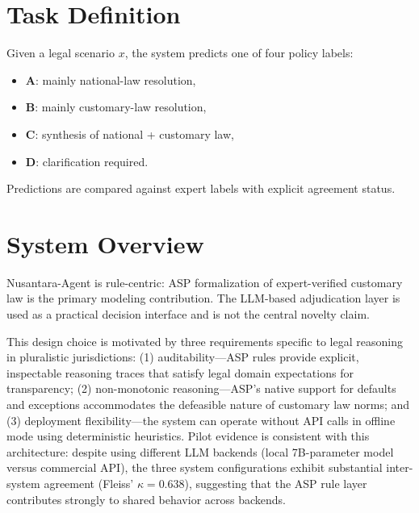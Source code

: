 \documentclass[11pt]{article}
\begin{document}
\section{Task Definition}
Given a legal scenario $x$, the system predicts one of four policy labels:
\begin{itemize}[nosep]
  \item \textbf{A}: mainly national-law resolution,
  \item \textbf{B}: mainly customary-law resolution,
  \item \textbf{C}: synthesis of national + customary law,
  \item \textbf{D}: clarification required.
\end{itemize}

\noindent
Predictions are compared against expert labels with explicit agreement status.

\section{System Overview}
Nusantara-Agent is rule-centric: ASP formalization of expert-verified customary law is the primary modeling contribution.
The LLM-based adjudication layer is used as a practical decision interface and is not the central novelty claim.

This design choice is motivated by three requirements specific to legal reasoning in pluralistic jurisdictions: (1) auditability---ASP rules provide explicit, inspectable reasoning traces that satisfy legal domain expectations for transparency; (2) non-monotonic reasoning---ASP's native support for defaults and exceptions accommodates the defeasible nature of customary law norms; and (3) deployment flexibility---the system can operate without API calls in offline mode using deterministic heuristics. Pilot evidence is consistent with this architecture: despite using different LLM backends (local 7B-parameter model versus commercial API), the three system configurations exhibit substantial inter-system agreement (Fleiss' $\kappa = 0.638$), suggesting that the ASP rule layer contributes strongly to shared behavior across backends.
\end{document}
